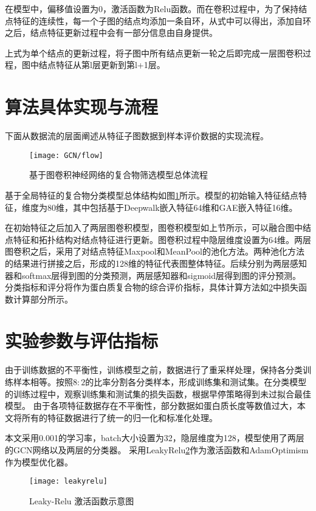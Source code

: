 在模型中，偏移值设置为0，激活函数为Relu函数。而在卷积过程中，为了保持结点特征的连续性，每一个子图的结点均添加一条自环，从式中可以得出，添加自环之后，结点特征更新过程中会有一部分信息由自身提供。

上式为单个结点的更新过程，将子图中所有结点更新一轮之后即完成一层图卷积过程，图中结点特征从第l层更新到第l+1层。

\section{算法具体实现与流程}
\label{section:NodeConv:flow}

下面从数据流的层面阐述从特征子图数据到样本评价数据的实现流程。
\begin{figure}[htbp]
    \centering
    \texttt{[image: GCN/flow]}
    \caption{基于图卷积神经网络的复合物筛选模型总体流程}
    \label{fig:GCN/flow}
\end{figure}

基于全局特征的复合物分类模型总体结构如图\ref{fig:GCN/flow}所示。模型的初始输入特征结点特征，维度为80维，其中包括基于Deepwalk嵌入特征64维和GAE嵌入特征16维。

在初始特征之后加入了两层图卷积模型，图卷积模型如上节所示，可以融合图中结点特征和拓扑结构对结点特征进行更新。图卷积过程中隐层维度设置为64维。两层图卷积之后，采用了对结点特征Maxpool和MeanPool的池化方法。两种池化方法的结果进行拼接之后，形成的128维的特征代表图整体特征。后续分别为两层感知器和softmax层得到图的分类预测，两层感知器和sigmoid层得到图的评分预测。
分类指标和评分将作为蛋白质复合物的综合评价指标，具体计算方法如\ref{section:NodeConv:allExperienceDesign}中损失函数计算部分所示。


\section{实验参数与评估指标}
\label{section:NodeConv:allExperienceDesign}
由于训练数据的不平衡性，训练模型之前，数据进行了重采样处理，保持各分类训练样本相等。按照$8:2$的比率分割各分类样本，形成训练集和测试集。在分类模型的训练过程中，观察训练集和测试集的损失函数，根据早停策略得到未过拟合最佳模型。
由于各项特征数据存在不平衡性，部分数据如蛋白质长度等数值过大，本文将所有的特征数据进行了统一的归一化和标准化处理。

本文采用0.001的学习率，batch大小设置为32，隐层维度为128，模型使用了两层的GCN网络以及两层的分类器。
采用LeakyRelu\ref{fig:leakyrelu}作为激活函数和AdamOptimism作为模型优化器。

\begin{figure}[htbp]
    \centering
    \texttt{[image: leakyrelu]}
    \caption{Leaky-Relu 激活函数示意图}
    \label{fig:leakyrelu}
\end{figure}

